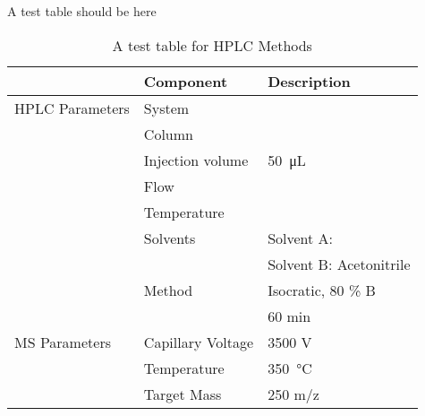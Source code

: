 A test table should be here

\begin{table}[h]
	\caption{A test table for HPLC Methods}
	\label{tab:asddf}
	\centering
	\begin{tabularx}{\textwidth}{XXX}
						& \textbf{Component}		& \textbf{Description}	\\
		\midrule
		HPLC Parameters & System			& 	\\
						& Column			& 	\\
						& Injection volume 	& \SI{50}{\micro\liter}	\\
						& Flow				& 	\\
						& Temperature		& 	\\
						& Solvents			& Solvent A: \ch{H2O}	\\
						& 					& Solvent B: Acetonitrile	\\
						& Method			& Isocratic, 80 \% B \\
						&					& 60 min \\
		MS Parameters	& Capillary Voltage	& 3500 V\\
						& Temperature		& \SI{350}{\celsius}	\\
						& Target Mass		& 250 m/z \\
		\bottomrule
	\end{tabularx}
\end{table}

